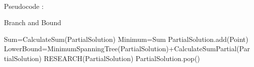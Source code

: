 \documentclass[12pt]{article}
\begin{document}
\\
Pseudocode : \\
\begin{algorithm}
  \caption{Branch and Bound}\label{euclid}
  \begin{algorithmic}[1]
	\State Sum=CalculateSum(PartialSolution)
	      \State Minimum=Sum
	\EndIf
      \EndIf
	      \State PartialSolution.add(Point)
	      \State LowerBound=MinimumSpanningTree(PartialSolution)+CalculateSumPartial(PartialSolution)
		\State RESEARCH(PartialSolution)
	      \EndIf
	       \State PartialSolution.pop()
	\EndIf
      \EndFor
    \EndFunction
  \end{algorithmic}
\end{algorithm}
\end{document}
